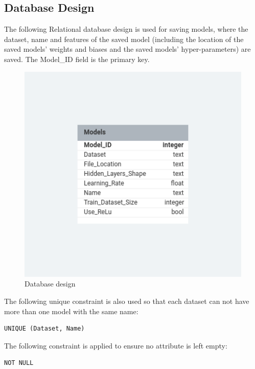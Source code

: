 \documentclass[./project-report/src/latex/project-report.tex]{subfiles}
\begin{document}
\pagebreak

\subsection{Database Design}

The following Relational database design is used for saving models, where the dataset, name and features of the saved model (including the location of the 
saved models' weights and biases and the saved models' hyper-parameters) are saved. The Model\_ID field is the primary key.

\begin{figure}[h!]
\centering
\includegraphics[width=1\textwidth]{./project-report/src/images/database-design.png}
\caption{Database design}
\label{fig:database-design}
\end{figure}

The following unique constraint is also used so that each dataset can not have more than one model with the same name:

\begin{verbatim}
UNIQUE (Dataset, Name)
\end{verbatim}

The following constraint is applied to ensure no attribute is left empty:

\begin{verbatim}
NOT NULL
\end{verbatim}
\end{document}
